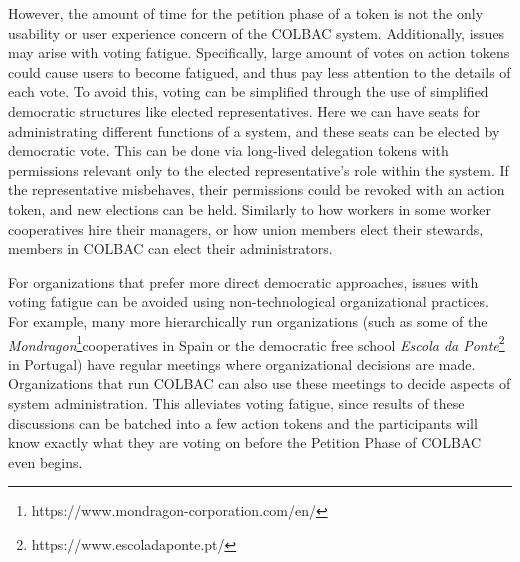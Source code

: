 
However, the amount of time for the petition phase of a token is not the only
usability or user experience concern of the COLBAC system. Additionally, issues
may arise with voting fatigue. Specifically, large amount of votes on action
tokens could cause users to become fatigued, and thus pay less attention to the
details of each vote. To avoid this, voting can be simplified through the use of
simplified democratic structures like elected representatives. Here we can have
seats for administrating different functions of a system, and these seats can be
elected by democratic vote. This can be done via long-lived delegation tokens
with permissions relevant only to the elected representative's role within the
system. If the representative misbehaves, their permissions could be revoked with
an action token, and new elections can be held. Similarly to how workers in some
worker cooperatives hire their managers, or how union members elect their
stewards, members in COLBAC can elect their administrators.

For organizations that prefer more direct democratic approaches, issues with
voting fatigue can be avoided using non-technological organizational practices.
For example, many more hierarchically run organizations (such as some of the 
\textit{Mondragon}\footnote{https://www.mondragon-corporation.com/en/}cooperatives
in Spain or the democratic free school 
\textit{Escola da Ponte}\footnote{https://www.escoladaponte.pt/} in
Portugal) have regular meetings where organizational decisions are made.
Organizations that run COLBAC can also use these meetings to decide aspects of
system administration. This alleviates voting fatigue, since results of these
discussions can be batched into a few action tokens and the participants will know
exactly what they are voting on before the Petition Phase of COLBAC even begins.
